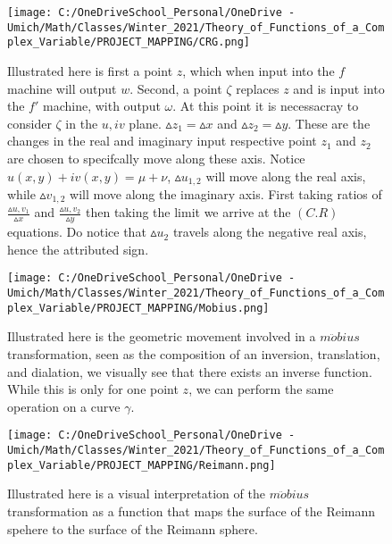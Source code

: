 \documentclass[a4paper,man,natbib]{apa6}
\begin{document}
\begin{figure}

      \centering
      \texttt{[image: C:/OneDriveSchool\_Personal/OneDrive - Umich/Math/Classes/Winter\_2021/Theory\_of\_Functions\_of\_a\_Complex\_Variable/PROJECT\_MAPPING/CRG.png]}
      \caption{\label{C:/OneDriveSchool_Personal/OneDrive - Umich/Math/Classes/Winter_2021/Theory_of_Functions_of_a_Complex_Variable/PROJECT_MAPPING/CRG.png}
      Illustrated here is first a point $ z $, which when input into the $ f $ machine will output $ w $. 
      Second, a point $ \zeta $ replaces $ z $ and is input into the $ f' $ machine, with output $ \omega $. 
      At this point it is necessacray to consider $ \zeta $ in the $ u,iv $ plane. 
      $ \vartriangle z_{1} = \vartriangle x $ and $ \vartriangle z_{2} = \vartriangle y $. 
      These are the changes in the real and imaginary input respective point $ z_{1} $ and $ z_{2} $ are chosen to specifcally move along these axis. 
      Notice $ u(x,y) + iv(x,y) = \mu + \nu $, $ \vartriangle u_{1,2} $ will move along the real axis, while $ \vartriangle v_{1,2} $ will move along the imaginary axis.
      First taking ratios of $ \frac{\vartriangle u,v_{1}}{\vartriangle x} $ and $ \frac{\vartriangle u,v_{2}}{\vartriangle y} $ then taking the limit we arrive at the $ (C.R) $ equations.
      Do notice that $ \vartriangle u_{2} $ travels along the negative real axis, hence the attributed sign.} 

\end{figure}

\begin{figure}

      \centering
      \texttt{[image: C:/OneDriveSchool\_Personal/OneDrive - Umich/Math/Classes/Winter\_2021/Theory\_of\_Functions\_of\_a\_Complex\_Variable/PROJECT\_MAPPING/Mobius.png]}
      \caption{\label{C:/OneDriveSchool_Personal/OneDrive - Umich/Math/Classes/Winter_2021/Theory_of_Functions_of_a_Complex_Variable/PROJECT_MAPPING/Mobius.png}
      Illustrated here is the geometric movement involved in a $ m\ddot{o}bius $ transformation, 
      seen as the composition of an inversion, translation, and dialation, we visually see that there exists an inverse function. 
      While this is only for one point $ z $, we can perform the same operation on a curve $ \gamma $.}

\end{figure}

\begin{figure}

      \centering
      \texttt{[image: C:/OneDriveSchool\_Personal/OneDrive - Umich/Math/Classes/Winter\_2021/Theory\_of\_Functions\_of\_a\_Complex\_Variable/PROJECT\_MAPPING/Reimann.png]}
      \caption{\label{C:/OneDriveSchool_Personal/OneDrive - Umich/Math/Classes/Winter_2021/Theory_of_Functions_of_a_Complex_Variable/PROJECT_MAPPING/Reimann.png}
      Illustrated here is a visual interpretation of the $ m\ddot{o}bius $ transformation 
      as a function that maps the surface of the Reimann spehere to the surface of the Reimann sphere.}

\end{figure}
\end{document}
